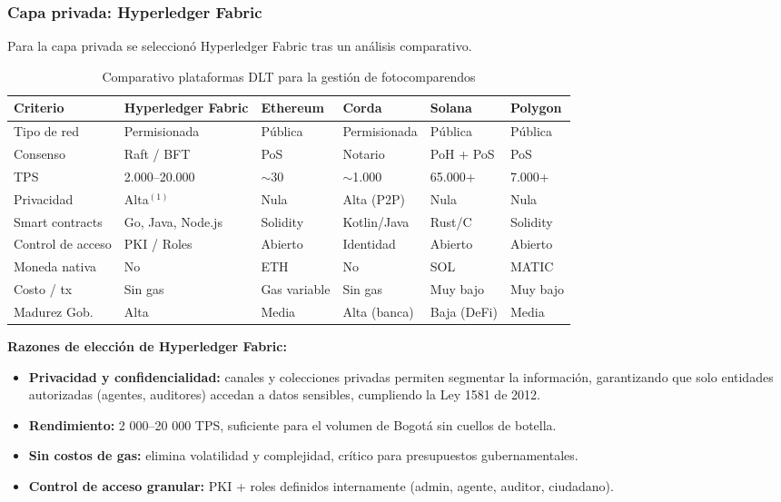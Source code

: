 \subsubsection{Capa privada: Hyperledger Fabric}

Para la capa privada se seleccionó Hyperledger Fabric tras un análisis comparativo.

\begin{table}[H]
\centering
\small
\caption{Comparativo plataformas DLT para la gestión de fotocomparendos}
\begin{tabular}{p{2.4cm}p{2.2cm}p{2cm}p{2cm}p{2cm}p{2cm}}
\toprule
\textbf{Criterio} & \textbf{Hyperledger Fabric} & \textbf{Ethereum} & \textbf{Corda} & \textbf{Solana} & \textbf{Polygon} \\
\midrule
Tipo de red & Permisionada & Pública & Permisionada & Pública & Pública \\
Consenso & Raft / BFT & PoS & Notario & PoH + PoS & PoS \\
TPS & 2.000–20.000 & $\sim$30 & $\sim$1.000 & 65.000+ & 7.000+ \\
Privacidad & Alta$^{(1)}$ & Nula & Alta (P2P) & Nula & Nula \\
Smart contracts & Go, Java, Node.js & Solidity & Kotlin/Java & Rust/C & Solidity \\
Control de acceso & PKI / Roles & Abierto & Identidad & Abierto & Abierto \\
Moneda nativa & No & ETH & No & SOL & MATIC \\
Costo / tx & Sin gas & Gas variable & Sin gas & Muy bajo & Muy bajo \\
Madurez Gob. & Alta & Media & Alta (banca) & Baja (DeFi) & Media \\
\bottomrule
\end{tabular}
\vspace{2pt}
\footnotesize
\label{tab:dlt_smart}
\end{table}

\textbf{Razones de elección de Hyperledger Fabric:}

\begin{itemize}
    \item \textbf{Privacidad y confidencialidad:} canales y colecciones privadas permiten segmentar la información, garantizando que solo entidades autorizadas (agentes, auditores) accedan a datos sensibles, cumpliendo la Ley 1581 de 2012.
    
    \item \textbf{Rendimiento:} 2 000–20 000 TPS, suficiente para el volumen de Bogotá sin cuellos de botella.
    
    \item \textbf{Sin costos de gas:} elimina volatilidad y complejidad, crítico para presupuestos gubernamentales.
    
    \item \textbf{Control de acceso granular:} PKI + roles definidos internamente (admin, agente, auditor, ciudadano).
\end{itemize}

